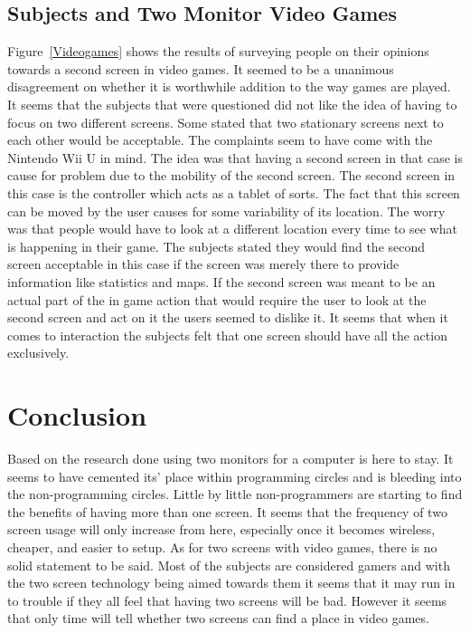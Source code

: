 \documentclass[11pt]{article}
\begin{document}
\subsection{Subjects and Two Monitor Video Games}
Figure~\ref{Videogames} shows the results of surveying people on their opinions towards a second screen in video games. It seemed to be a unanimous disagreement on whether it is worthwhile addition to the way games are played. It seems that the subjects that were questioned did not like the idea of having to focus on two different screens. Some stated that two stationary screens next to each other would be acceptable. The complaints seem to have come with the Nintendo Wii U in mind. The idea was that having a second screen in that case is cause for problem due to the mobility of the second screen. The second screen in this case is the controller which acts as a tablet of sorts. The fact that this screen can be moved by the user causes for some variability of its location. The worry was that people would have to look at a different location every time to see what is happening in their game. The subjects stated they would find the second screen acceptable in this case if the screen was merely there to provide information like statistics and maps. If the second screen was meant to be an actual part of the in game action that would require the user to look at the second screen and act on it the users seemed to dislike it. It seems that when it comes to interaction the subjects felt that one screen should have all the action exclusively.

\section{Conclusion}
Based on the research done using two monitors for a computer is here to stay. It seems to have cemented its’ place within programming circles and is bleeding into the non-programming circles. Little by little non-programmers are starting to find the benefits of having more than one screen. It seems that the frequency of two screen usage will only increase from here, especially once it becomes wireless, cheaper, and easier to setup. As for two screens with video games, there is no solid statement to be said. Most of the subjects are considered gamers and with the two screen technology being aimed towards them it seems that it may run in to trouble if they all feel that having two screens will be bad. However it seems that only time will tell whether two screens can find a place in video games.
\end{document}
